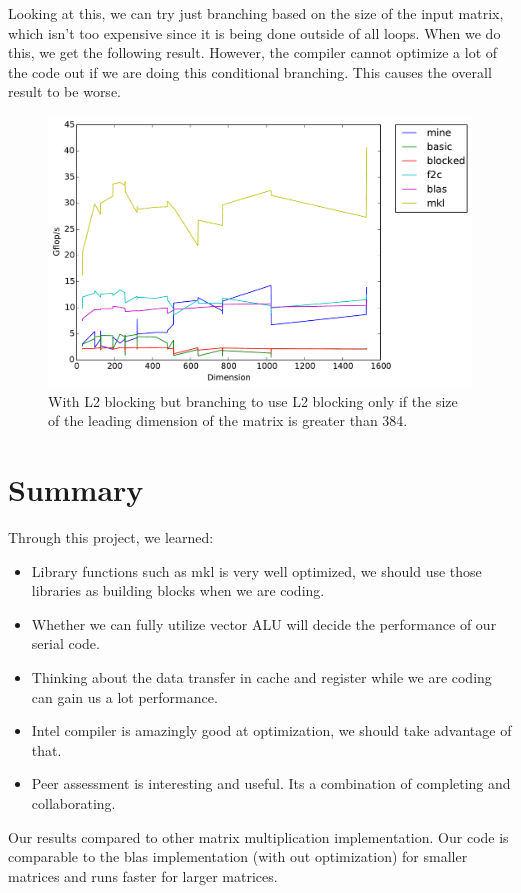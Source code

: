 \documentclass[11pt]{article}
\begin{document}
        Looking at this, we can try just branching based on the size of the input matrix, which isn't too expensive since it is being done outside of all loops. When we do this, we get the following result. However, the compiler cannot optimize a lot of the code out if we are doing this conditional branching. This causes the overall result to be worse.
        \begin{figure}[H]
            \centering
            \includegraphics[width=4.5in]{timing_L2_2.pdf}
            \caption{With L2 blocking but branching to use L2 blocking only if the size of the leading dimension of the matrix is greater than 384.}
        \end{figure}
    
        \clearpage
    \section{Summary}
        
    Through this project, we learned:
    \begin{itemize}
        \item Library functions such as mkl is very well optimized, we should use those libraries as building blocks when we are coding.
        \item Whether we can fully utilize vector ALU will decide the performance of our serial code.
        \item Thinking about the data transfer in cache and register while we are coding can gain us a lot performance.
        \item Intel compiler is amazingly good at optimization, we should take advantage of that.
        \item Peer assessment is interesting and useful. Its a combination of completing and collaborating.
    \end{itemize}

    Our results compared to other matrix multiplication implementation. Our code is comparable to the blas implementation (with out optimization) for smaller matrices and runs faster for larger matrices.
\end{document}
